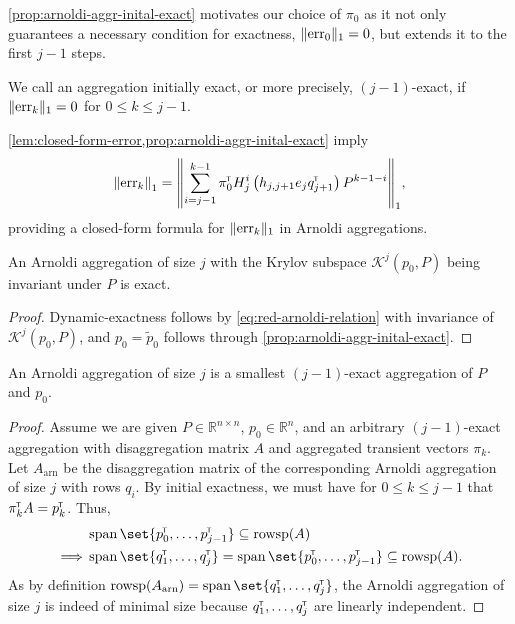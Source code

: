 \documentclass[runningheads]{llncs}
\newcommand*{\bbR}{\mathbb{R}}
\newcommand*{\errvec}{\mathrm{err}}
\newcommand*{\transp}{^{\mkern-1.5mu{\scriptscriptstyle\mathsf{T}}}}
\DeclareMathOperator{\rowsp}{rowsp}
\DeclareMathOperator{\spn}{span}
\DeclarePairedDelimiter{\norm}{\lVert}{\rVert}
\begin{document}
\cref{prop:arnoldi-aggr-inital-exact} motivates our choice of $\pi_0$ as
it not only guarantees a necessary condition for exactness, $\norm{\errvec_0}_1 = 0$, but extends it to the first $j - 1$ steps.
\begin{definition}
    We call an aggregation initially exact, or more precisely, $(j - 1)$-exact, if $\norm{\errvec_k}_1 = 0$ for $0 \leq k \leq j - 1$.
\end{definition}
\begin{remark}
    \cref{lem:closed-form-error,prop:arnoldi-aggr-inital-exact} imply
    \[
        \norm*{\errvec_k}_1 = \norm*{\sum_{i = j - 1}^{k - 1} \pi_0\transp H_j^i \left(h_{j, j + 1} e_j q_{j + 1}\transp\right) P^{k - 1 - i}}_1,
    \]
    providing a closed-form formula for $\norm{\errvec_k}_1$ in Arnoldi aggregations.
\end{remark}
\begin{proposition}\label{prop:arnoldi-aggr-invar-exact}
    An Arnoldi aggregation of size $j$ with the Krylov subspace $\mathcal{K}^j(p_0, P)$ being invariant under $P$ is exact.
\end{proposition}
\begin{proof}
    Dynamic-exactness follows by \cref{eq:red-arnoldi-relation} with invariance of $\mathcal{K}^j(p_0, P)$, and $p_0 = \tilde{p}_0$ follows through \cref{prop:arnoldi-aggr-inital-exact}.
\end{proof}
\begin{theorem}\label{thrm:smallest-initial-exact-aggr}
    An Arnoldi aggregation of size $j$ is a smallest $(j - 1)$-exact aggregation of $P$ and $p_0$.
\end{theorem}
\begin{proof}
    Assume we are given $P \in \bbR^{n \times n}$, $p_0 \in \bbR^n$, and an arbitrary $(j - 1)$-exact aggregation with disaggregation matrix $A$ and aggregated transient vectors $\pi_k$.
    Let $A_{\mathrm{arn}}$ be the disaggregation matrix of the corresponding Arnoldi aggregation of size $j$ with rows $q_i$.
    By initial exactness, we must have for $0 \leq k \leq j - 1$ that $\pi_k\transp A = p_k\transp$.
    Thus,
    \begin{align*}
        & \spn \set{p_0\transp, \dots, p_{j - 1}\transp} \subseteq \rowsp(A)\\
        \implies & \spn \set{q_1\transp, \dots, q_j\transp} = \spn \set{p_0\transp, \dots, p_{j - 1}\transp} \subseteq \rowsp(A).
    \end{align*}
    As by definition $\rowsp(A_\mathrm{arn}) = \spn \set{q_1\transp, \dots, q_j\transp}$, the Arnoldi aggregation of size $j$ is indeed of minimal size because $q_1\transp, \dots, q_j\transp$ are linearly independent.
\end{proof}
\end{document}
